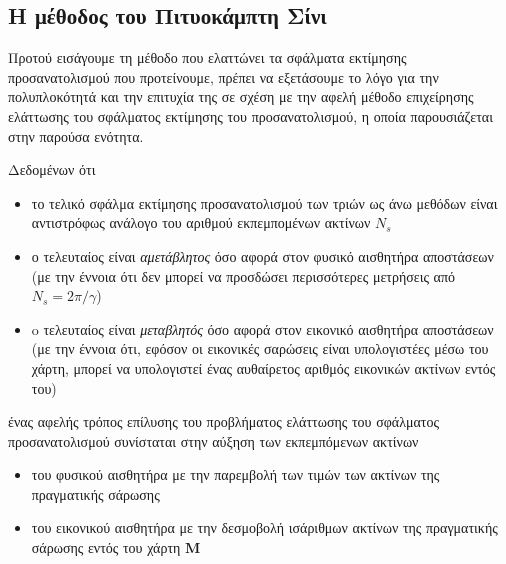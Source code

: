 \subsection{Η μέθοδος του Πιτυοκάμπτη Σίνι}
\label{subsection:02_04_02:05}

Προτού εισάγουμε τη μέθοδο που ελαττώνει τα σφάλματα εκτίμησης προσανατολισμού
που προτείνουμε, πρέπει να εξετάσουμε το λόγο για την πολυπλοκότητά και την
επιτυχία της σε σχέση με την αφελή μέθοδο επιχείρησης ελάττωσης του σφάλματος
εκτίμησης του προσανατολισμού, η οποία παρουσιάζεται στην παρούσα ενότητα.

Δεδομένων ότι

\begin{itemize}
  \item το τελικό σφάλμα εκτίμησης προσανατολισμού των τριών ως άνω
        μεθόδων είναι αντιστρόφως ανάλογο του αριθμού εκπεμπομένων ακτίνων $N_s$
  \item ο τελευταίος είναι \textit{αμετάβλητος} όσο αφορά στον φυσικό αισθητήρα
        αποστάσεων (με την έννοια ότι δεν μπορεί να προσδώσει περισσότερες
        μετρήσεις από $N_s = 2\pi/\gamma$)
  \item o τελευταίος είναι \textit{μεταβλητός} όσο αφορά στον εικονικό αισθητήρα
        αποστάσεων (με την έννοια ότι, εφόσον οι εικονικές σαρώσεις είναι
        υπολογιστέες μέσω του χάρτη, μπορεί να υπολογιστεί ένας αυθαίρετος
        αριθμός εικονικών ακτίνων εντός του)
\end{itemize}
ένας αφελής τρόπος επίλυσης του προβλήματος ελάττωσης του σφάλματος
προσανατολισμού συνίσταται στην αύξηση των εκπεμπόμενων ακτίνων
\begin{itemize}
  \item του φυσικού αισθητήρα με την παρεμβολή των τιμών των ακτίνων της
        πραγματικής σάρωσης
  \item του εικονικού αισθητήρα με την δεσμοβολή ισάριθμων ακτίνων της
        πραγματικής σάρωσης εντός του χάρτη $\bm{M}$
\end{itemize}


